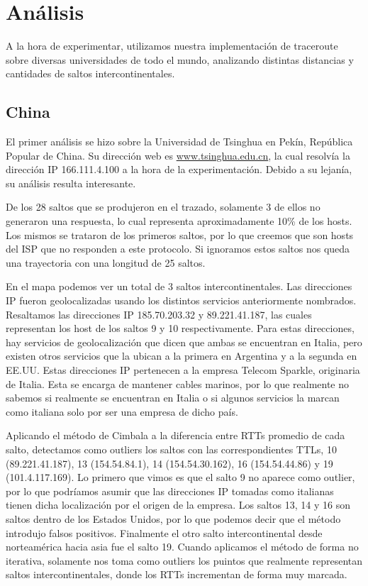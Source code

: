 \section{Análisis}

A la hora de experimentar, utilizamos nuestra implementación de traceroute sobre diversas universidades de todo el mundo, analizando distintas distancias y cantidades de saltos intercontinentales.

\subsection{China}

El primer análisis se hizo sobre la Universidad de Tsinghua en Pekín, República Popular de China. Su dirección web es \url{www.tsinghua.edu.cn}, la cual resolvía la dirección IP 166.111.4.100 a la hora de la experimentación. Debido a su lejanía, su análisis resulta interesante.

De los 28 saltos que se produjeron en el trazado, solamente 3 de ellos no generaron una respuesta, lo cual representa aproximadamente 10\% de los hosts. Los mismos se trataron de los primeros saltos, por lo que creemos que son hosts del ISP que no responden a este protocolo. Si ignoramos estos saltos nos queda una trayectoria con una longitud de 25 saltos.

En el mapa podemos ver un total de 3 saltos intercontinentales. Las direcciones IP fueron geolocalizadas usando los distintos servicios anteriormente nombrados. Resaltamos las direcciones IP 185.70.203.32 y 89.221.41.187, las cuales representan los host de los saltos 9 y 10 respectivamente. Para estas direcciones, hay servicios de geolocalización que dicen que ambas se encuentran en Italia, pero existen otros servicios que la ubican a la primera en Argentina y a la segunda en EE.UU. Estas direcciones IP pertenecen a la empresa Telecom Sparkle, originaria de Italia. Esta se encarga de mantener cables marinos, por lo que realmente no sabemos si realmente se encuentran en Italia o si algunos servicios la marcan como italiana solo por ser una empresa de dicho país.

Aplicando el método de Cimbala a la diferencia entre RTTs promedio de cada salto, detectamos como outliers los saltos con las correspondientes TTLs, 10 (89.221.41.187), 13 (154.54.84.1), 14 (154.54.30.162), 16 (154.54.44.86) y 19 (101.4.117.169). Lo primero que vimos es que el salto 9 no aparece como outlier, por lo que podríamos asumir que las direcciones IP tomadas como italianas tienen dicha localización por el origen de la empresa. Los saltos 13, 14 y 16 son saltos dentro de los Estados Unidos, por lo que podemos decir que el método introdujo falsos positivos. Finalmente el otro salto intercontinental desde norteamérica hacia asia fue el salto 19. Cuando aplicamos el método de  forma no iterativa, solamente nos toma como outliers los puintos que realmente representan saltos intercontinentales, donde los RTTs incrementan de forma muy marcada.

